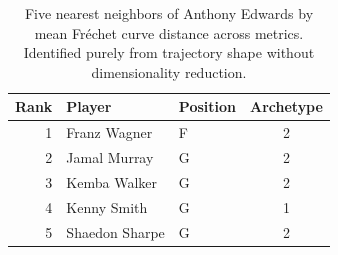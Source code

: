 \begin{table}[htbp]
  \centering\small
  \begin{tabular}{rllc}
    \toprule
    Rank & Player & Position & Archetype \\
    \midrule
    1 & Franz Wagner & F & 2 \\
    2 & Jamal Murray & G & 2 \\
    3 & Kemba Walker & G & 2 \\
    4 & Kenny Smith & G & 1 \\
    5 & Shaedon Sharpe & G & 2 \\
    \bottomrule
  \end{tabular}
  \caption{Five nearest neighbors of Anthony Edwards by mean Fr\'{e}chet curve distance across metrics. Identified purely from trajectory shape without dimensionality reduction.}
  \label{tab:Anthony_Edwards_frechet_curve_neighbors}
\end{table}


